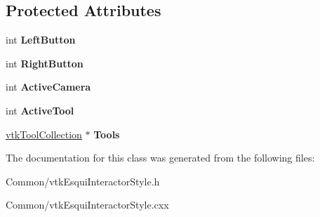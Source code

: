\subsection*{Protected Attributes}
\begin{DoxyCompactItemize}
\item 
\hypertarget{classvtkEsquiInteractorStyle_a0e0e400b6023397b96b0175fe20e82ef}{
int {\bfseries LeftButton}}
\label{classvtkEsquiInteractorStyle_a0e0e400b6023397b96b0175fe20e82ef}

\item 
\hypertarget{classvtkEsquiInteractorStyle_a30bfd6d7129f4b02e6d57183fb10d93d}{
int {\bfseries RightButton}}
\label{classvtkEsquiInteractorStyle_a30bfd6d7129f4b02e6d57183fb10d93d}

\item 
\hypertarget{classvtkEsquiInteractorStyle_aed877283835eca1972d386acc96c5287}{
int {\bfseries ActiveCamera}}
\label{classvtkEsquiInteractorStyle_aed877283835eca1972d386acc96c5287}

\item 
\hypertarget{classvtkEsquiInteractorStyle_a10d3a52629039246c5e0c05eb7b0e558}{
int {\bfseries ActiveTool}}
\label{classvtkEsquiInteractorStyle_a10d3a52629039246c5e0c05eb7b0e558}

\item 
\hypertarget{classvtkEsquiInteractorStyle_a6025e6f3e5f9f9700b72050ae7ee31be}{
\hyperlink{classvtkToolCollection}{vtkToolCollection} $\ast$ {\bfseries Tools}}
\label{classvtkEsquiInteractorStyle_a6025e6f3e5f9f9700b72050ae7ee31be}

\end{DoxyCompactItemize}


The documentation for this class was generated from the following files:\begin{DoxyCompactItemize}
\item 
Common/vtkEsquiInteractorStyle.h\item 
Common/vtkEsquiInteractorStyle.cxx\end{DoxyCompactItemize}
